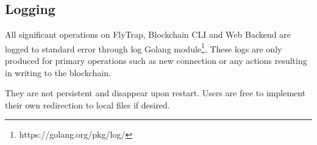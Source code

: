 \subsection{Logging}
All significant operations on FlyTrap, Blockchain CLI and Web Backend are logged to standard error through log Golang module\footnote{https://golang.org/pkg/log/}. These logs are only produced for primary operations such as new connection or any actions resulting in writing to the blockchain.

They are not persistent and disappear upon restart. Users are free to implement their own redirection to local files if desired.

